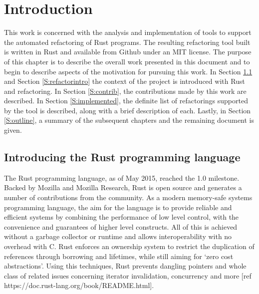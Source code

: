 \chapter{Introduction}\label{C:intro}
This work is concerned with the analysis and implementation of tools to support the automated refactoring of Rust programs. The resulting refactoring tool built is written in Rust and available from Github under an MIT license. The purpose of this chapter is to describe the overall work presented in this document and to begin to describe aspects of the motivation for pursuing this work. In Section \ref{S:rustintro} and Section \ref{S:refactorintro} the context of the project is introduced with Rust and refactoring. In Section \ref{S:contrib}, the contributions made by this work are described. In Section \ref{S:implemented}, the definite list of refactorings supported by the tool is described, along with a brief description of each. Lastly, in Section \ref{S:outline}, a summary of the subsequent chapters and the remaining document is given.


\section{Introducing the Rust programming language}\label{S:rustintro}


The Rust programming language, as of May 2015, reached the 1.0 milestone. Backed by Mozilla and Mozilla Research, Rust is open source and generates a number of contributions from the community. As a modern memory-safe systems programming language, the aim for the language is to provide reliable and efficient systems by combining the performance of low level control, with the convenience and guarantees of higher level constructs. All of this is achieved without a garbage collector or runtime and allows interoperability with no overhead with C. Rust enforces an ownership system to restrict the duplication of references through borrowing and lifetimes, while still aiming for `zero cost abstractions'. Using this techniques, Rust prevents dangling pointers and whole class of related issues concerning iterator invalidation, concurrency and more [ref https://doc.rust-lang.org/book/README.html].

